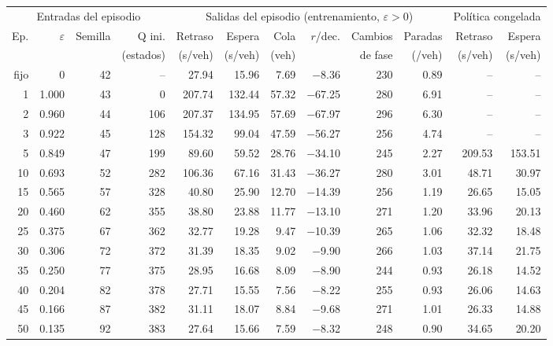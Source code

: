 \begin{table}[H]
\centering
\scriptsize
\setlength{\tabcolsep}{3pt}
\begin{tabular}{rrrrrrrrrrrr}
\toprule
\multicolumn{4}{c}{Entradas del episodio} & \multicolumn{6}{c}{Salidas del episodio (entrenamiento, $\varepsilon>0$)} & \multicolumn{2}{c}{Política congelada} \\
\cmidrule(lr){1-4}\cmidrule(lr){5-10}\cmidrule(lr){11-12}
Ep. & $\varepsilon$ & Semilla & Q ini. & Retraso & Espera & Cola & $r$/dec. & Cambios & Paradas & Retraso & Espera \\
 &  &  & (estados) & (s/veh) & (s/veh) & (veh) &  & de fase & (/veh) & (s/veh) & (s/veh) \\
\midrule
fijo & 0 & 42 & -- & 27.94 & 15.96 & 7.69 & $-$8.36 & 230 & 0.89 & -- & -- \\
\midrule
1 & 1.000 & 43 & 0 & 207.74 & 132.44 & 57.32 & $-$67.25 & 280 & 6.91 & -- & -- \\
2 & 0.960 & 44 & 106 & 207.37 & 134.95 & 57.69 & $-$67.97 & 296 & 6.30 & -- & -- \\
3 & 0.922 & 45 & 128 & 154.32 & 99.04 & 47.59 & $-$56.27 & 256 & 4.74 & -- & -- \\
5 & 0.849 & 47 & 199 & 89.60 & 59.52 & 28.76 & $-$34.10 & 245 & 2.27 & 209.53 & 153.51 \\
10 & 0.693 & 52 & 282 & 106.36 & 67.16 & 31.43 & $-$36.27 & 280 & 3.01 & 48.71 & 30.97 \\
15 & 0.565 & 57 & 328 & 40.80 & 25.90 & 12.70 & $-$14.39 & 256 & 1.19 & 26.65 & 15.05 \\
20 & 0.460 & 62 & 355 & 38.80 & 23.88 & 11.77 & $-$13.10 & 271 & 1.20 & 33.96 & 20.13 \\
25 & 0.375 & 67 & 362 & 32.77 & 19.28 & 9.47 & $-$10.39 & 265 & 1.06 & 32.32 & 18.48 \\
30 & 0.306 & 72 & 372 & 31.39 & 18.35 & 9.02 & $-$9.90 & 266 & 1.03 & 37.14 & 21.75 \\
35 & 0.250 & 77 & 375 & 28.95 & 16.68 & 8.09 & $-$8.90 & 244 & 0.93 & 26.18 & 14.52 \\
40 & 0.204 & 82 & 378 & 27.71 & 15.55 & 7.56 & $-$8.22 & 255 & 0.93 & 26.06 & 14.63 \\
45 & 0.166 & 87 & 382 & 31.11 & 18.07 & 8.84 & $-$9.68 & 271 & 1.01 & 26.33 & 14.88 \\
50 & 0.135 & 92 & 383 & 27.64 & 15.66 & 7.59 & $-$8.32 & 248 & 0.90 & 34.65 & 20.20 \\

\end{tabular}
\end{table}
